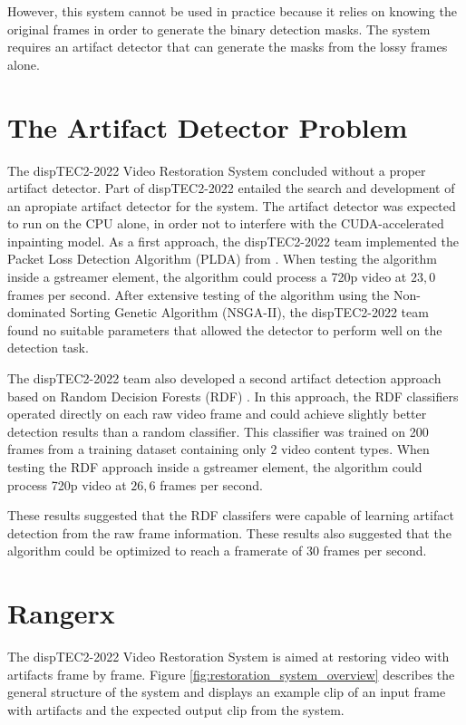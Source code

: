 However, this system cannot be used in practice because it relies on knowing the original frames in order to generate the binary detection masks. The system requires an artifact detector that can generate the masks from the lossy frames alone.

\section{The Artifact Detector Problem}
\label{sec:intro_problem}

The dispTEC2-2022 Video Restoration System concluded without a proper artifact detector. Part of dispTEC2-2022 entailed the search and development of an apropiate artifact detector for the system. The artifact detector was expected to run on the CPU alone, in order not to interfere with the CUDA-accelerated inpainting model. As a first approach, the dispTEC2-2022 team implemented the Packet Loss Detection Algorithm (PLDA) from \cite{Vranjes2018}. When testing the algorithm inside a gstreamer element, the algorithm could process a 720p video at $23,0$ frames per second.  After extensive testing of the algorithm using the Non-dominated Sorting Genetic Algorithm (NSGA-II), the dispTEC2-2022 team found no suitable parameters that allowed the detector to perform well on the detection task.

The dispTEC2-2022 team also developed a second artifact detection approach based on Random Decision Forests (RDF) \cite{Breiman2001}. In this approach, the RDF classifiers operated directly on each raw video frame and could achieve slightly better detection results than a random classifier. This classifier was trained on 200 frames from a training dataset containing only 2 video content types. When testing the RDF approach inside a gstreamer element, the algorithm could process 720p video at $26,6$ frames per second.

These results suggested that the RDF classifers were capable of learning artifact detection from the raw frame information. These results also suggested that the algorithm could be optimized to reach a framerate of $30$ frames per second.


\section{Rangerx}
\label{sec:intro_detector}

The dispTEC2-2022 Video Restoration System is aimed at restoring video with artifacts frame by frame. Figure \ref{fig:restoration_system_overview} describes the general structure of the system and displays an example clip of an input frame with artifacts and the expected output clip from the system.

